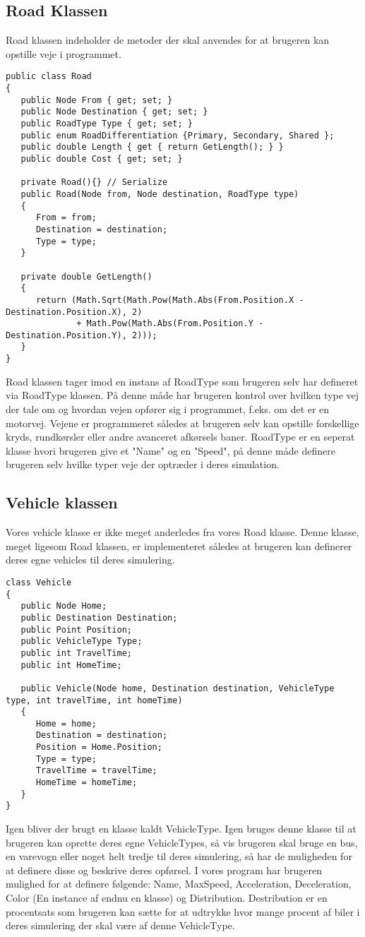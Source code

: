 \subsection{Road Klassen}
Road klassen indeholder de metoder der skal anvendes for at brugeren kan opstille veje i programmet.
\begin{lstlisting}
public class Road
{
   public Node From { get; set; }
   public Node Destination { get; set; }
   public RoadType Type { get; set; }
   public enum RoadDifferentiation {Primary, Secondary, Shared };
   public double Length { get { return GetLength(); } }
   public double Cost { get; set; }

   private Road(){} // Serialize
   public Road(Node from, Node destination, RoadType type)
   {
      From = from;
      Destination = destination;
      Type = type;
   }

   private double GetLength()
   {
      return (Math.Sqrt(Math.Pow(Math.Abs(From.Position.X - Destination.Position.X), 2) 
              + Math.Pow(Math.Abs(From.Position.Y - Destination.Position.Y), 2)));
   }
}
\end{lstlisting}
Road klassen tager imod en instans af RoadType som brugeren selv har defineret via RoadType klassen. På denne måde har brugeren kontrol over hvilken type vej der tale om og hvordan vejen opfører sig i programmet, f.eks. om det er en motorvej. Vejene er programmeret således at brugeren selv kan opstille forskellige kryds, rundkørsler eller andre avanceret afkørsels baner. RoadType er en seperat klasse hvori brugeren give et "Name" og en "Speed", på denne måde definere brugeren selv hvilke typer veje der optræder i deres simulation.

\subsection{Vehicle klassen}
Vores vehicle klasse er ikke meget anderledes fra vores Road klasse. Denne klasse, meget ligesom Road klassen, er implementeret således at brugeren kan definerer deres egne vehicles til deres simulering.
\begin{lstlisting}
class Vehicle
{
   public Node Home;
   public Destination Destination;
   public Point Position;
   public VehicleType Type;
   public int TravelTime;
   public int HomeTime;

   public Vehicle(Node home, Destination destination, VehicleType type, int travelTime, int homeTime)
   {
      Home = home;
      Destination = destination;
      Position = Home.Position;
      Type = type;
      TravelTime = travelTime;
      HomeTime = homeTime;
   }
}
\end{lstlisting}
Igen bliver der brugt en klasse kaldt VehicleType. Igen bruges denne klasse til at brugeren kan oprette deres egne VehicleTypes, så vis brugeren skal bruge en bus, en varevogn eller noget helt tredje til deres simulering, så har de muligheden for at definere disse og beskrive deres opførsel. I vores program har brugeren mulighed for at definere følgende: Name, MaxSpeed, Acceleration, Deceleration, Color (En instance af endnu en klasse) og Distribution. Destribution er en procentsats som brugeren kan sætte for at udtrykke hvor mange procent af biler i deres simulering der skal være af denne VehicleType.

